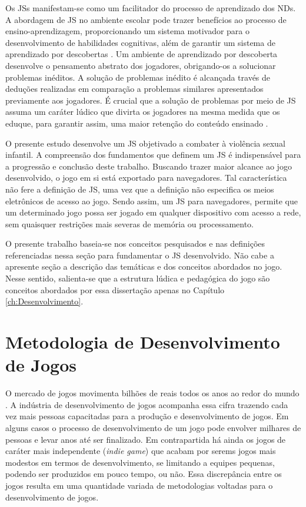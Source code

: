 Os \acp{JS} manifestam-se como um facilitador do processo de aprendizado dos \acp{ND}. A abordagem de \ac{JS} no ambiente escolar pode trazer benefícios ao processo de ensino-aprendizagem, proporcionando um sistema motivador para o desenvolvimento de habilidades cognitivas, além de garantir um sistema de aprendizado por descobertas \cite{carvalho2017move4math}. Um ambiente de aprendizado por descoberta desenvolve o pensamento abstrato dos jogadores, obrigando-os a solucionar problemas inéditos. A solução de problemas inédito é alcançada través de deduções realizadas em comparação a problemas similares apresentados previamente aos jogadores. É crucial que a solução de problemas por meio de \ac{JS} assuma um caráter lúdico que divirta os jogadores na mesma medida que os eduque, para garantir assim, uma maior retenção do conteúdo ensinado \cite{tarouco2004jogos}. 

O presente estudo desenvolve um \ac{JS} objetivado a combater à violência sexual infantil. A compreensão dos fundamentos que definem um \ac{JS} é indispensável para a progressão e conclusão deste trabalho. Buscando trazer maior alcance ao jogo desenvolvido, o jogo em si está exportado para navegadores. Tal característica não fere a definição de \ac{JS}, uma vez que a definição não especifica os meios eletrônicos de acesso ao jogo. Sendo assim, um \ac{JS} para navegadores, permite que um determinado jogo possa ser jogado em qualquer dispositivo com acesso a rede, sem quaisquer restrições mais severas de memória ou processamento. 

O presente trabalho baseia-se nos conceitos pesquisados e nas definições referenciadas nessa seção para fundamentar o \ac{JS} desenvolvido. Não cabe a apresente seção a descrição das temáticas e dos conceitos abordados no jogo. Nesse sentido, salienta-se que a estrutura lúdica e pedagógica do jogo são conceitos abordados por essa dissertação apenas no Capítulo \ref{ch:Desenvolvimento}.


\section{Metodologia de Desenvolvimento de Jogos}\label{sec:Engenharia}

O mercado de jogos movimenta bilhões de reais todos os anos ao redor do mundo \cite{fortim2020games}. A indústria de desenvolvimento de jogos acompanha essa cifra trazendo cada vez mais pessoas capacitadas para a produção e desenvolvimento de jogos. Em alguns casos o processo de desenvolvimento de um jogo pode envolver milhares de pessoas e levar anos até ser finalizado. Em contrapartida há ainda os jogos de caráter mais independente (\textit{indie game}) que acabam por serems jogos mais modestos em termos de desenvolvimento, se limitando a equipes pequenas, podendo ser produzidos em pouco tempo, ou não. Essa discrepância entre os jogos resulta em uma quantidade variada de metodologias voltadas para o desenvolvimento de jogos.

